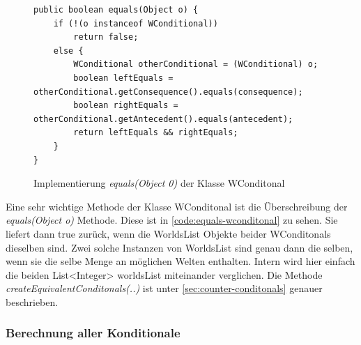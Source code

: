 \documentclass[12pt,a4paper]{article}
\begin{document}
\begin{figure}
\begin{lstlisting}
public boolean equals(Object o) {
    if (!(o instanceof WConditional))
        return false;
    else {
        WConditional otherConditional = (WConditional) o;
        boolean leftEquals = otherConditional.getConsequence().equals(consequence);
        boolean rightEquals = otherConditional.getAntecedent().equals(antecedent);
        return leftEquals && rightEquals;
    }
}
\end{lstlisting}
\caption{Implementierung \textit{equals(Object 0)} der Klasse WConditonal}
\label{code:equals-wconditonal}
\end{figure}


Eine sehr wichtige Methode der Klasse WConditonal ist die Überschreibung der \textit{equals(Object o)} Methode. Diese ist in \autoref{code:equals-wconditonal} zu sehen. Sie liefert dann true zurück, wenn die WorldsList Objekte beider WConditonals dieselben sind. Zwei solche Instanzen von WorldsList sind genau dann die selben, wenn sie die selbe Menge an möglichen Welten enthalten. Intern wird hier einfach die beiden List<Integer> worldsList miteinander verglichen. Die Methode \textit{createEquivalentConditonals(..)} ist unter \autoref{sec:counter-conditonals} genauer beschrieben.


\subsubsection{Berechnung aller Konditionale}
\end{document}
